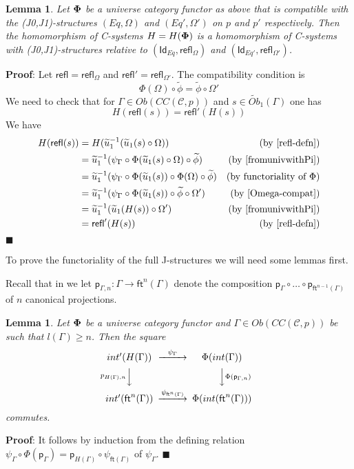 \documentclass[12pt]{article}
\numberwithin{equation}{section}
\newenvironment{eq}{\begin{equation}}{\end{equation}}
\newenvironment{myproof}{{\bf Proof}:}{$\blacksquare$ \vskip 5mm }
\newtheorem{lemma}[proposition]{Lemma}
\newcommand{\by}[1]{\text{(by #1)}}
\newcommand{\sr}{\rightarrow}
\newcommand{\wt}{\widetilde}
\newcommand{\toCC}{CC} %
\newcommand{\C}{{\mathcal C}}  %
\newcommand{\ft}{\mathsf{ft}}
\newcommand{\p}{\mathsf{p}}
\newcommand{\Id}{\mathsf{Id}} %
\newcommand{\refl}{\mathsf{refl}}
\newcommand{\Obwt}{\wt{Ob}}
\begin{document}
\begin{lemma}
\label{2015.04.12.l2} Let ${\bf\Phi}$ be a universe category functor as above
that is compatible with the (J0,J1)-structures $(Eq,\Omega)$ and
$(Eq',\Omega')$ on $p$ and $p'$ respectively. Then the homomorphism of
C-systems $H=H({\bf\Phi})$ is a homomorphism of C-systems with
(J0,J1)-structures relative to $(\Id_{Eq},\refl_{\Omega})$ and
$(\Id_{Eq'},\refl_{\Omega'})$.
\end{lemma}
%
\begin{myproof}
Let $\refl=\refl_{\Omega}$ and $\refl'=\refl_{\Omega'}$. The compatibility
condition is
%
\begin{eq}
  \label{Omega-compat}
  \Phi(\Omega)\circ\wt{\phi}=\wt{\phi}\circ\Omega'
\end{eq}
%
We need to check that for $\Gamma\in Ob(\toCC({\C},p))$ and $s\in
\Obwt_1(\Gamma)$ one has
%
$$H(\refl(s))=\refl'(H(s))$$
%
We have
%
\begin{align*}
  H(\refl(s))
    & = H(\wt{u}_1^{-1}(\wt{u}_1(s)\circ\Omega)) & \by{\ref{refl-defn}} \\
    & = \wt{u}_1^{-1}(\psi_{\Gamma}\circ\Phi(\wt{u}_1(s)\circ\Omega)\circ\wt{\phi}) & \by{\cite[Lemma 6.1(2)]{fromunivwithPi}} \\
    & = \wt{u}_1^{-1}(\psi_{\Gamma}\circ\Phi(\wt{u}_1(s))\circ\Phi(\Omega)\circ \wt{\phi}) & \by{functoriality of $\Phi$} \\
    & = \wt{u}_1^{-1}(\psi_{\Gamma}\circ\Phi(\wt{u}_1(s))\circ\wt{\phi}\circ\Omega') & \by{\ref{Omega-compat}} \\
    & = \wt{u}_1^{-1}(\wt{u}_1(H(s))\circ\Omega') & \by{\cite[Lemma 6.1(2)]{fromunivwithPi}} \\
    & = \refl'(H(s)) & \by{\ref{refl-defn}}
\end{align*}
\end{myproof}
%

To prove the functoriality of the full J-structures we will need some lemmas
first.

Recall that in \cite{Csubsystems} we let $\p_{\Gamma,n}:\Gamma\sr \ft^n(\Gamma)$
denote the composition $\p_{\Gamma}\circ \dots\circ \p_{\ft^{n-1}(\Gamma)}$ of $n$ canonical projections.
%
\begin{lemma}
\label{2015.05.10.l1} Let ${\bf\Phi}$ be a universe category functor and
$\Gamma\in Ob(\toCC({\C},p))$ be such that $l(\Gamma)\ge n$. Then the
square
%
$$
\begin{CD}
int'(H(\Gamma)) @>\psi_{\Gamma}>> \Phi(int(\Gamma))\\ @Vp_{H(\Gamma),n} VV
@VV\Phi(\p_{\Gamma,n})V\\ int'(\ft^n(\Gamma)) @>\psi_{\ft^n(\Gamma)}>>
\Phi(int(\ft^n(\Gamma)))
\end{CD}
$$
%
commutes.
\end{lemma}
%
\begin{myproof}
It follows by induction from the defining relation
$\psi_{\Gamma}\circ \Phi(\p_{\Gamma})=\p_{H(\Gamma)}\circ \psi_{\ft(\Gamma)}$
of $\psi_{\Gamma}$.
\end{myproof}
\end{document}
